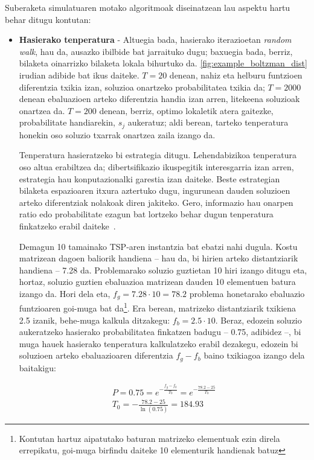 \documentclass[eu]{ifirak}\usepackage[]{graphicx}\usepackage[]{color}
\begin{document}
Suberaketa simulatuaren motako algoritmoak diseinatzean lau aspektu hartu behar ditugu kontutan:
\begin{itemize}
\item \textbf{Hasierako tenperatura} - Altuegia bada, hasierako iterazioetan \textit{random walk}, hau da, ausazko ibilbide bat jarraituko dugu; baxuegia bada, berriz, bilaketa oinarrizko bilaketa lokala bihurtuko da. \ref{fig:example_boltzman_dist} irudian adibide bat ikus daiteke. $T=20$ denean, nahiz eta helburu funtzioen diferentzia txikia izan, soluzioa onartzeko probabilitatea txikia da; $T=2000$ denean ebaluazioen arteko diferentzia handia izan arren, litekeena soluzioak onartzea da. $T=200$ denean, berriz, optimo lokaletik atera gaitezke, probabilitate handiarekin, $s_j$ aukeratuz; aldi berean, tarteko tenperatura honekin oso soluzio txarrak onartzea zaila izango da. 

Tenperatura hasieratzeko bi estrategia ditugu. Lehendabizikoa tenperatura oso altua erabiltzea da; dibertsifikazio ikuspegitik interesgarria izan arren, estrategia hau konputazionalki garestia izan daiteke. Beste estrategian bilaketa espazioaren itxura aztertuko dugu, ingurunean dauden soluzioen arteko diferentziak nolakoak diren jakiteko. Gero, informazio hau onarpen ratio edo probabilitate ezagun bat lortzeko behar dugun tenperatura finkatzeko erabil daiteke~\cite{huang1986,aarts1987}.


\begin{tcolorbox}
\begin{ifexample}
Demagun 10 tamainako TSP-aren instantzia bat ebatzi nahi dugula. Kostu matrizean dagoen baliorik handiena -- hau da, bi hirien arteko distantziarik handiena -- 7.28 da. Problemarako soluzio guztietan 10 hiri izango ditugu eta, hortaz, soluzio guztien ebaluazioa matrizean dauden 10 elementuen batura izango da. Hori dela eta, $f_g=7.28 \cdot 10=78.2$ problema honetarako ebaluazio funtzioaren goi-muga bat da\footnote{Kontutan hartuz aipatutako baturan matrizeko elementuak ezin direla errepikatu, goi-muga birfindu daiteke 10 elementurik handienak batuz}. Era berean, matrizeko distantziarik txikiena 2.5 izanik, behe-muga kalkula ditzakegu: $f_b = 2.5\cdot 10$. Beraz, edozein soluzio aukeratzeko hasierako probabilitatea finkatzen badugu -- 0.75, adibidez --, bi muga hauek hasierako tenperatura kalkulatzeko erabil dezakegu, edozein bi soluzioen arteko ebaluazioaren diferentzia $f_g-f_b$ baino txikiagoa izango dela baitakigu:

\begin{align*}
P=0.75= e^{-\frac{f_g-f_b}{T_0}} = e^{-\frac{78.2-25}{T_0}}\\
T_0 = -\frac{78.2-25}{\ln(0.75)} = 184.93
\end{align*}


\end{ifexample}
\end{tcolorbox}
\end{itemize}
\end{document}
